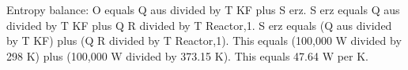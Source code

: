 Entropy balance:  
O equals Q aus divided by T KF plus S erz.  
S erz equals Q aus divided by T KF plus Q R divided by T Reactor,1.  
S erz equals (Q aus divided by T KF) plus (Q R divided by T Reactor,1).  
This equals (100,000 W divided by 298 K) plus (100,000 W divided by 373.15 K).  
This equals 47.64 W per K.